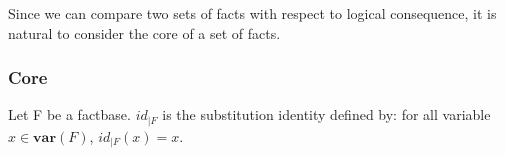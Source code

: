 \documentclass{article}
\theoremstyle{definition}
\theoremstyle{remark}
\begin{document}

Since we can compare two sets of facts with respect to logical consequence, it is natural to consider the core of a set of facts.



\subsubsection{Core}

Let F be a factbase. $id_{|F}$ is the substitution identity defined by: for all variable $x \in \textbf{var}(F)$, $id_{|F}(x) = x$. 
\end{document}
